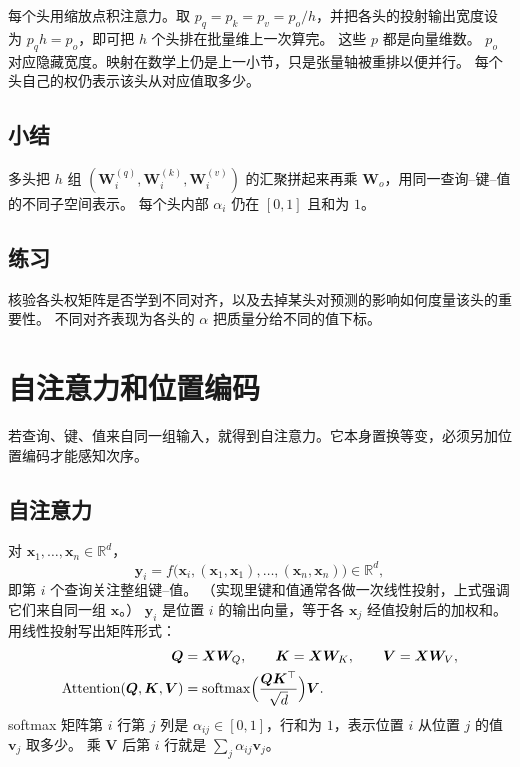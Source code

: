 每个头用缩放点积注意力。取 $p_q=p_k=p_v=p_o/h$，并把各头的投射输出宽度设为
$p_q h=p_o$，即可把 $h$ 个头排在批量维上一次算完。
这些 $p$ 都是向量维数。
$p_o$ 对应隐藏宽度。映射在数学上仍是上一小节，只是张量轴被重排以便并行。
每个头自己的权仍表示该头从对应值取多少。

\subsection{小结}

多头把 $h$ 组
$(\bm{W}_{i}^{(q)},\bm{W}_{i}^{(k)},\bm{W}_{i}^{(v)})$
的汇聚拼起来再乘 $\bm{W}_{o}$，用同一查询--键--值的不同子空间表示。
每个头内部 $\alpha_i$ 仍在 $[0,1]$ 且和为 $1$。

\subsection{练习}

核验各头权矩阵是否学到不同对齐，以及去掉某头对预测的影响如何度量该头的重要性。
不同对齐表现为各头的 $\alpha$ 把质量分给不同的值下标。

\section{自注意力和位置编码}



若查询、键、值来自同一组输入，就得到自注意力。它本身置换等变，必须另加位置编码才能感知次序。

\subsection{自注意力}

对 $\bm{x}_1,\ldots,\bm{x}_n\in\mathbb{R}^{d}$，
\[
\bm{y}_i
=
f\bigl(\bm{x}_i,(\bm{x}_1,\bm{x}_1),\ldots,(\bm{x}_n,\bm{x}_n)\bigr)
\in\mathbb{R}^{d},
\]
即第 $i$ 个查询关注整组键--值。
（实现里键和值通常各做一次线性投射，上式强调它们来自同一组 $\bm{x}$。）
$\bm{y}_i$ 是位置 $i$ 的输出向量，等于各 $\bm{x}_j$ 经值投射后的加权和。
用线性投射写出矩阵形式：
\begin{align*}
\bm{Q}&=\bm{X}\bm{W}_{Q},
\qquad
\bm{K}=\bm{X}\bm{W}_{K},
\qquad
\bm{V}=\bm{X}\bm{W}_{V},
\\
\operatorname{Attention}(\bm{Q},\bm{K},\bm{V})
&=
\operatorname{softmax}\Bigl(\frac{\bm{Q}\bm{K}^{\top}}{\sqrt{d}}\Bigr)\bm{V}.
\end{align*}
softmax 矩阵第 $i$ 行第 $j$ 列是 $\alpha_{ij}\in[0,1]$，行和为 $1$，表示位置 $i$ 从位置 $j$ 的值 $\bm{v}_j$ 取多少。
乘 $\bm{V}$ 后第 $i$ 行就是 $\sum_j\alpha_{ij}\bm{v}_j$。

